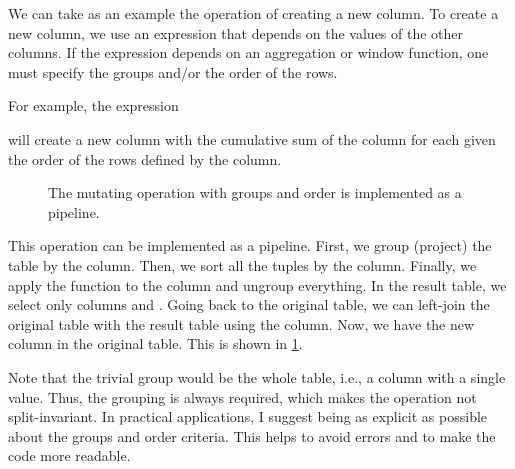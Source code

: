 We can take as an example the operation of creating a new column.  To create a new column,
we use an expression that depends on the values of the other columns.  If the expression
depends on an aggregation or window function, one must specify the groups and/or the order
of the rows.

For example, the expression
\begin{center}
\end{center}
will create a new column  with the cumulative sum of the  column for each
 given the order of the rows defined by the  column.

\begin{figure}
  \centering
  \caption{
  The mutating operation with groups and order is implemented as a pipeline.
  }
  \label{fig:mutating-groups-order}
\end{figure}

This operation can be implemented as a pipeline.  First, we group (project) the table by
the  column.  Then, we sort all the tuples by the  column. Finally,
we apply the  function to the  column and ungroup everything.  In the
result table, we select only columns  and .  Going back to the
original table, we can left-join the original table with the result table using the
 column.  Now, we have the new column  in the original table.
This is shown in \cref{fig:mutating-groups-order}.

Note that the trivial group would be the whole table, i.e., a column with a single value.
Thus, the grouping is always required, which makes the operation not split-invariant.
In practical applications, I suggest being as explicit as possible about the groups and
order criteria.  This helps to avoid errors and to make the code more readable.

